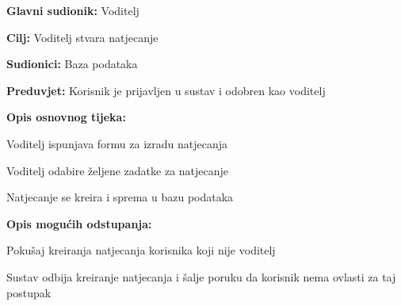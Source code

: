 					
					\noindent {}
					\begin{packed_item}
						
						\item \textbf{Glavni sudionik: }Voditelj
						\item  \textbf{Cilj:} Voditelj stvara natjecanje  
						\item  \textbf{Sudionici:} Baza podataka
						\item  \textbf{Preduvjet:} Korisnik je prijavljen u sustav i odobren kao voditelj
						\item  \textbf{Opis osnovnog tijeka:}
						
						\item[] \begin{packed_enum}
							
							\item Voditelj ispunjava formu za izradu natjecanja
							\item Voditelj odabire željene zadatke za natjecanje
							\item Natjecanje se kreira i sprema u bazu podataka
							
						\end{packed_enum}
						
						\item  \textbf{Opis mogućih odstupanja:}
						
						\item[] \begin{packed_item}
							
							\item[2.a] Pokušaj kreiranja natjecanja korisnika koji nije voditelj
							\item[] \begin{packed_enum}
								
								\item Sustav odbija kreiranje natjecanja i šalje poruku da korisnik nema ovlasti za taj postupak 
								
							\end{packed_enum}
						\end{packed_item}
					\end{packed_item}
					
